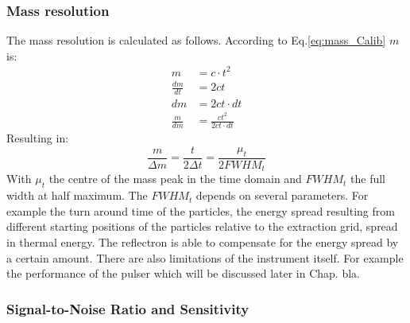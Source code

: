 	\subsubsection{Mass resolution} %
	The mass resolution is calculated as follows. According to Eq.\ref{eq:mass_Calib} $m$ is:
	\begin{align*}
		m &= c\cdot t^2\\
		\frac{dm}{dt} &= 2ct\\
		dm &= 2ct\cdot dt\\
		\frac{m}{dm} &= \frac{ct^2}{2ct\cdot dt}
	\end{align*}
	Resulting in:
	\begin{equation}
		\frac{m}{\Delta m} = \frac{t}{2 \Delta t} = \frac{\mu_t}{2 FWHM_t}
		\label{eq:mass_res}
	\end{equation}
	With $\mu_t$ the centre of the mass peak in the time domain and $FWHM_t$ the full width at half maximum. The $FWHM_t$ depends on several parameters. For example the turn around time of the particles, the energy spread resulting from different starting positions of the particles relative to the extraction grid, spread in thermal energy. The reflectron is able to compensate for the energy spread by a certain amount. %
	There are also limitations of the instrument itself. For example the performance of the pulser which will be discussed later in Chap. bla.

	
	
	\subsubsection{Signal-to-Noise Ratio and Sensitivity}
	
